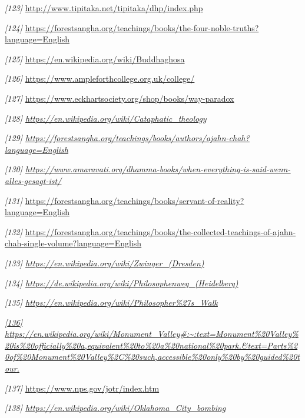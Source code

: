 \emph{{[}123{]}} \url{http://www.tipitaka.net/tipitaka/dhp/index.php}

\emph{{[}124{]}}
\url{https://forestsangha.org/teachings/books/the-four-noble-truths?language=English}

\emph{{[}125{]}} \url{https://en.wikipedia.org/wiki/Buddhaghosa}

\emph{{[}126{]}} \url{https://www.ampleforthcollege.org.uk/college/}

\emph{{[}127{]}}
\url{https://www.eckhartsociety.org/shop/books/way-paradox}

\emph{{[}128{]}
\href{https://en.wikipedia.org/wiki/Cataphatic_theology}{\underline{https://en.wikipedia.org/wiki/Cataphatic\_theology}}}

\emph{{[}129{]}
\href{https://forestsangha.org/teachings/books/authors/ajahn-chah?language=English}{\underline{https://forestsangha.org/teachings/books/authors/ajahn-chah?language=English}}}

\emph{{[}130{]}
\href{https://www.amaravati.org/dhamma-books/when-everything-is-said-wenn-alles-gesagt-ist/}{\underline{https://www.amaravati.org/dhamma-books/when-everything-is-said-wenn-alles-gesagt-ist/}}}

\emph{{[}131{]}}
\url{https://forestsangha.org/teachings/books/servant-of-reality?language=English}

\emph{{[}132{]}}
\url{https://forestsangha.org/teachings/books/the-collected-teachings-of-ajahn-chah-single-volume?language=English}

\emph{{[}133{]}
\underline{\url{https://en.wikipedia.org/wiki/Zwinger_(Dresden}\href{https://en.wikipedia.org/wiki/Zwinger_(Dresden)}{)}}}

\emph{{[}134{]}
\underline{\url{https://de.wikipedia.org/wiki/Philosophenweg_(Heidelberg}\href{https://de.wikipedia.org/wiki/Philosophenweg_(Heidelberg)}{)}}}

\emph{{[}135{]}
\href{https://en.wikipedia.org/wiki/Philosopher's_Walk}{\underline{https://en.wikipedia.org/wiki/Philosopher\%27s\_Walk}}}

\emph{\underline{{[}136{]}}}
\emph{\underline{\url{https://en.wikipedia.org/wiki/Monument_Valley\#:~:text=Monument\%20Valley\%20is\%20officially\%20a,equivalent\%20to\%20a\%20national\%20park.\&text=Parts\%20of\%20Monument\%20Valley\%2C\%20such,accessible\%20only\%20by\%20guided\%20tour}.}}

\emph{{[}137{]}} \url{https://www.nps.gov/jotr/index.htm}

\emph{{[}138{]}
\href{https://en.wikipedia.org/wiki/Oklahoma_City_bombing}{\underline{https://en.wikipedia.org/wiki/Oklahoma\_City\_bombing}}}

